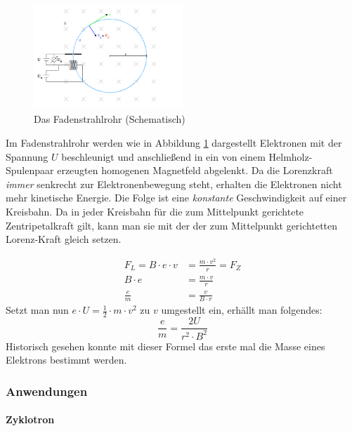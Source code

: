 \documentclass[a4paper]{article}
\begin{document}
				\begin{figure}[H]
					\centering
					\includegraphics[width=0.5\textwidth]{img/fadensrahlrohr.png}
					\caption{Das Fadenstrahlrohr (Schematisch)}
					\label{img:fadensrahlrohr}
				\end{figure}
				Im Fadenstrahlrohr werden wie in Abbildung \ref{img:fadensrahlrohr} dargestellt Elektronen mit der Spannung $U$ beschleunigt und anschließend in ein von einem Helmholz-Spulenpaar erzeugten homogenen Magnetfeld abgelenkt. Da die Lorenzkraft \textit{immer} senkrecht zur Elektronenbewegung steht, erhalten die Elektronen nicht mehr kinetische Energie. Die Folge ist eine \textit{konstante} Geschwindigkeit auf einer Kreisbahn. Da in jeder Kreisbahn für die zum Mittelpunkt gerichtete Zentripetalkraft gilt, kann man sie mit der der zum Mittelpunkt gerichtetten Lorenz-Kraft gleich setzen.
				
				\begin{equation}
				\begin{aligned} 
				F_L=B\cdot e \cdot v &= \frac{m\cdot v^2}{r} = F_Z\\
				B\cdot e &= \frac{m\cdot v}{r}\\
				\frac{e}{m} &= \frac{v}{B\cdot r}
				\end{aligned}
				\end{equation}
				Setzt man nun $e\cdot U=\frac{1}{2}\cdot m\cdot v^2$ zu $v$ umgestellt ein, erhällt man folgendes:
				\begin{equation}
					\frac{e}{m} = \frac{2U}{r^2\cdot B^2}
				\end{equation}
				Historisch gesehen konnte mit dieser Formel das erste mal die Masse eines Elektrons bestimmt werden.
				
		\subsubsection{Anwendungen}
			\paragraph{Zyklotron}
			
\end{document}
